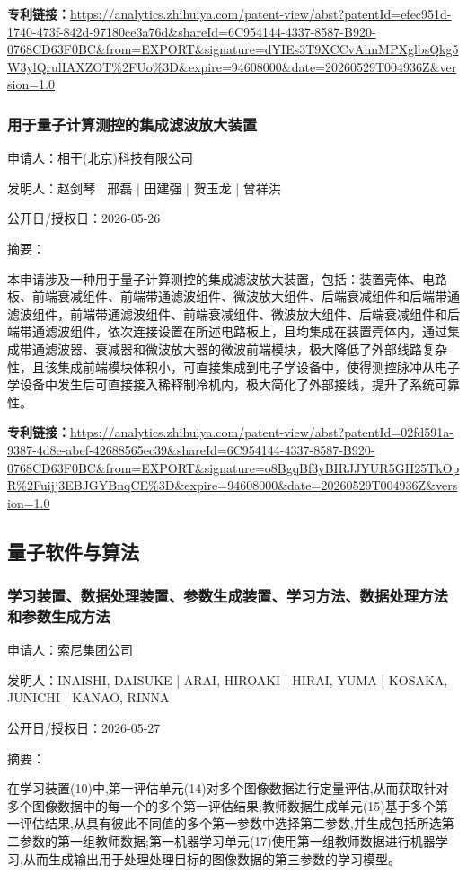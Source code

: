 \documentclass[12pt,a4paper]{ctexart}
\begin{document}
\noindent\textbf{专利链接：}\url{https://analytics.zhihuiya.com/patent-view/abst?patentId=efec951d-1740-473f-842d-97180ce3a76d&shareId=6C954144-4337-8587-B920-0768CD63F0BC&from=EXPORT&signature=dYIEs3T9XCCvAhnMPXglbsQkg5W3ylQrulIAXZOT%2FUo%3D&expire=94608000&date=20260529T004936Z&version=1.0 }

\subsubsection{ 用于量子计算测控的集成滤波放大装置 }

申请人：相干(北京)科技有限公司

发明人：赵剑琴 | 邢磊 | 田建强 | 贺玉龙 | 曾祥洪

公开日/授权日：2026-05-26

摘要：

本申请涉及一种用于量子计算测控的集成滤波放大装置，包括：装置壳体、电路板、前端衰减组件、前端带通滤波组件、微波放大组件、后端衰减组件和后端带通滤波组件，前端带通滤波组件、前端衰减组件、微波放大组件、后端衰减组件和后端带通滤波组件，依次连接设置在所述电路板上，且均集成在装置壳体内，通过集成带通滤波器、衰减器和微波放大器的微波前端模块，极大降低了外部线路复杂性，且该集成前端模块体积小，可直接集成到电子学设备中，使得测控脉冲从电子学设备中发生后可直接接入稀释制冷机内，极大简化了外部接线，提升了系统可靠性。

\noindent\textbf{专利链接：}\url{https://analytics.zhihuiya.com/patent-view/abst?patentId=02fd591a-9387-4d8e-abef-42688565ec39&shareId=6C954144-4337-8587-B920-0768CD63F0BC&from=EXPORT&signature=o8BgqBf3yBIRJJYUR5GH25TkOpR%2Fuijj3EBJGYBnqCE%3D&expire=94608000&date=20260529T004936Z&version=1.0 }


\subsection{ 量子软件与算法 }

\subsubsection{ 学习装置、数据处理装置、参数生成装置、学习方法、数据处理方法和参数生成方法 }

申请人：索尼集团公司

发明人：INAISHI, DAISUKE | ARAI, HIROAKI | HIRAI, YUMA | KOSAKA, JUNICHI | KANAO, RINNA

公开日/授权日：2026-05-27

摘要：

在学习装置(10)中,第一评估单元(14)对多个图像数据进行定量评估,从而获取针对多个图像数据中的每一个的多个第一评估结果;教师数据生成单元(15)基于多个第一评估结果,从具有彼此不同值的多个第一参数中选择第二参数,并生成包括所选第二参数的第一组教师数据;第一机器学习单元(17)使用第一组教师数据进行机器学习,从而生成输出用于处理处理目标的图像数据的第三参数的学习模型。
\end{document}
